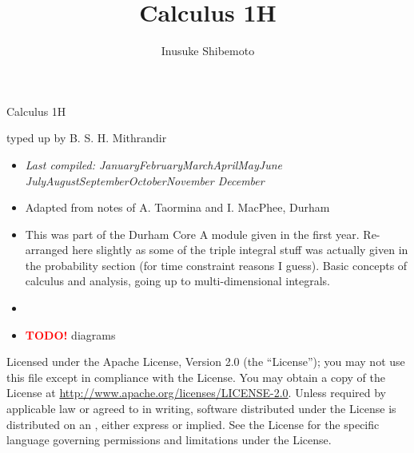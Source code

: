 \documentclass[letter-paper]{tufte-book}
\title{Calculus 1H}
\author[]{Inusuke Shibemoto}
\newcommand{\monthyear}{%
  \ifcase\month\or January\or February\or March\or April\or May\or June\or
  July\or August\or September\or October\or November\or
  December\fi\space\number\year
}
\newcommand{\TODO}{\textcolor{red}{\bf TODO!}\xspace}
\begin{document}



\chapter*{}

\begin{fullwidth}

\par \begin{center}{\Huge Calculus 1H}\end{center}

\vspace*{5mm}

\par \begin{center}{\Large typed up by B. S. H. Mithrandir}\end{center}

\vspace*{5mm}

\begin{itemize}
  \item \textit{Last compiled: \monthyear}
  \item Adapted from notes of A. Taormina and I. MacPhee, Durham
  \item This was part of the Durham Core A module given in the first year.
  Re-arranged here slightly as some of the triple integral stuff was actually
  given in the probability section (for time constraint reasons I guess). Basic
  concepts of calculus and analysis, going up to multi-dimensional integrals.
  \item[]
  \item \TODO diagrams
\end{itemize}

\par

\par Licensed under the Apache License, Version 2.0 (the ``License''); you may not
use this file except in compliance with the License. You may obtain a copy
of the License at \url{http://www.apache.org/licenses/LICENSE-2.0}. Unless
required by applicable law or agreed to in writing, software distributed
under the License is distributed on an , either express or implied. See the
License for the specific language governing permissions and limitations
under the License.
\end{fullwidth}
\end{document}
